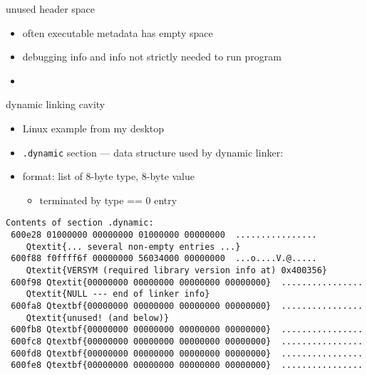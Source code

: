 \begin{frame}{unused header space}
    \begin{itemize}
    \item often executable metadata has empty space
    \vspace{.5cm}
    \item debugging info and info not strictly needed to run program
    \item {}
    \end{itemize}
\end{frame}

\begin{frame}[label=spaceDyn,fragile]{dynamic linking cavity}
\begin{itemize}
\item Linux example from my desktop
\item {\tt .dynamic} section --- data structure used by dynamic linker:
\item format: list of 8-byte type, 8-byte value
    \begin{itemize}
    \item terminated by type == 0 entry
    \end{itemize}
\end{itemize}
\begin{Verbatim}[fontsize=\fontsize{9}{10}\selectfont,commandchars=Q\{\}]
Contents of section .dynamic:
 600e28 01000000 00000000 01000000 00000000  ................
    Qtextit{... several non-empty entries ...}
 600f88 f0ffff6f 00000000 56034000 00000000  ...o....V.@.....
    Qtextit{VERSYM (required library version info at) 0x400356}
 600f98 Qtextit{00000000 00000000 00000000 00000000}  ................
    Qtextit{NULL --- end of linker info}
 600fa8 Qtextbf{00000000 00000000 00000000 00000000}  ................
    Qtextit{unused! (and below)}
 600fb8 Qtextbf{00000000 00000000 00000000 00000000}  ................
 600fc8 Qtextbf{00000000 00000000 00000000 00000000}  ................
 600fd8 Qtextbf{00000000 00000000 00000000 00000000}  ................
 600fe8 Qtextbf{00000000 00000000 00000000 00000000}  ................
\end{Verbatim}
\end{frame}


